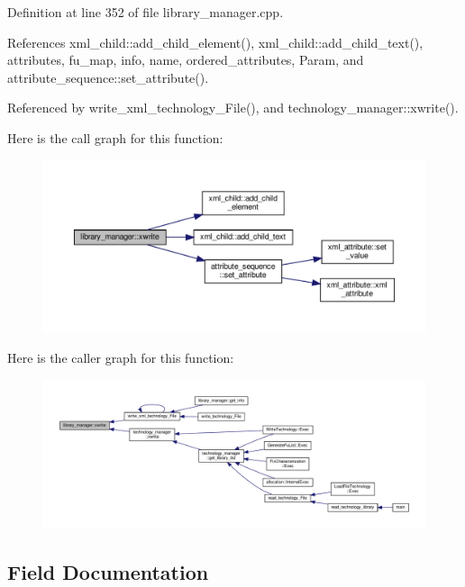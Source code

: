 Definition at line 352 of file library\+\_\+manager.\+cpp.



References xml\+\_\+child\+::add\+\_\+child\+\_\+element(), xml\+\_\+child\+::add\+\_\+child\+\_\+text(), attributes, fu\+\_\+map, info, name, ordered\+\_\+attributes, Param, and attribute\+\_\+sequence\+::set\+\_\+attribute().



Referenced by write\+\_\+xml\+\_\+technology\+\_\+\+File(), and technology\+\_\+manager\+::xwrite().

Here is the call graph for this function\+:
\nopagebreak
\begin{figure}[H]
\begin{center}
\leavevmode
\includegraphics[width=350pt]{d8/d35/classlibrary__manager_a696beb5208cbe5a27144d59757b72682_cgraph}
\end{center}
\end{figure}
Here is the caller graph for this function\+:
\nopagebreak
\begin{figure}[H]
\begin{center}
\leavevmode
\includegraphics[width=350pt]{d8/d35/classlibrary__manager_a696beb5208cbe5a27144d59757b72682_icgraph}
\end{center}
\end{figure}


\subsection{Field Documentation}
\mbox{\label{classlibrary__manager_aeedcfac2940fb2d4e5ae1d88bdbf089e}} 
